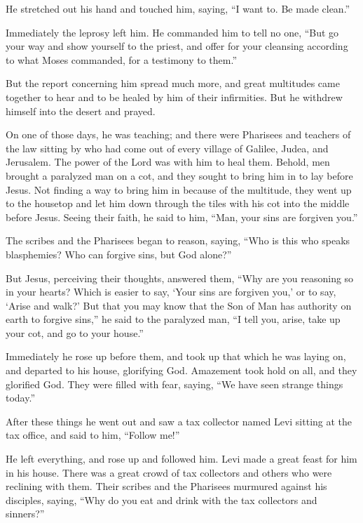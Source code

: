 He stretched out his hand and touched him, saying, ``I
want to. Be made clean.''

Immediately the leprosy left him.  He commanded him to
tell no one, ``But go your way and show yourself to the priest, and
offer for your cleansing according to what Moses commanded, for a
testimony to them.''

 But the report concerning him spread much more, and
great multitudes came together to hear and to be healed by him of their
infirmities.  But he withdrew himself into the desert and
prayed.

 On one of those days, he was teaching; and there were
Pharisees and teachers of the law sitting by who had come out of every
village of Galilee, Judea, and Jerusalem. The power of the Lord was with
him to heal them.  Behold, men brought a paralyzed man on
a cot, and they sought to bring him in to lay before Jesus.
 Not finding a way to bring him in because of the
multitude, they went up to the housetop and let him down through the
tiles with his cot into the middle before Jesus.  Seeing
their faith, he said to him, ``Man, your sins are forgiven you.''

 The scribes and the Pharisees began to reason, saying,
``Who is this who speaks blasphemies? Who can forgive sins, but God
alone?''

 But Jesus, perceiving their thoughts, answered them,
``Why are you reasoning so in your hearts?  Which is
easier to say, `Your sins are forgiven you,' or to say, `Arise and
walk?'  But that you may know that the Son of Man has
authority on earth to forgive sins,'' he said to the paralyzed man, ``I
tell you, arise, take up your cot, and go to your house.''

 Immediately he rose up before them, and took up that
which he was laying on, and departed to his house, glorifying God.
 Amazement took hold on all, and they glorified God. They
were filled with fear, saying, ``We have seen strange things today.''

 After these things he went out and saw a tax collector
named Levi sitting at the tax office, and said to him, ``Follow me!''

 He left everything, and rose up and followed him.
 Levi made a great feast for him in his house. There was
a great crowd of tax collectors and others who were reclining with them.
 Their scribes and the Pharisees murmured against his
disciples, saying, ``Why do you eat and drink with the tax collectors
and sinners?''

